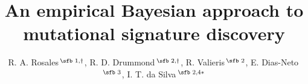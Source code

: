 \documentclass{bioinfo}
\begin{document}
\title[empirical Bayesian NMF]{An empirical Bayesian approach to
  mutational signature discovery}
\author[Rosales, R. A. and Drummond, R. D.~\textit{et~al}.]{
    R. A. Rosales\,$^{\text{\sfb 1,}\dagger}$, 
    R. D. Drummond\,$^{\text{\sfb 2,}\dagger}$, 
    R. Valieris\,$^{\text{\sfb 2}}$,
    E. Dias-Neto\,$^{\text{\sfb 3}}$,
    I. T. da Silva\,$^{\text{\sfb 2,4}*}$} 
\address{%
   $^{\text{\sf 1}}$Departamento de Computa\c{c}\~ao e
   Matem\'atica, Universidade de S\~ao Paulo, 14040-901 SP, Brazil\\ 
   $^{\text{\sf 2}}$Laboratory of Bioinformatics and Computational 
   Biology, CIPE/A.C. Camargo Cancer Center, S\~ao Paulo  01509-010, 
   Brazil\\
   $^{\text{\sf 3}}$Centro de Pesquisas do Hospital AC Camargo,
    S\~ao Paulo 01509-010 Brazil\\
   $^{\text{\sf 4}}$Laboratory of Molecular Immunology, The
   Rockefeller University, New York, NY 10065, USA\\[1em]
   {\normalsize $^{\dagger}$The authors wish it to be known
     that, in their opinion, the first two authors should be regarded
     as joint First Authors} 
}
\maketitle
\end{document}
